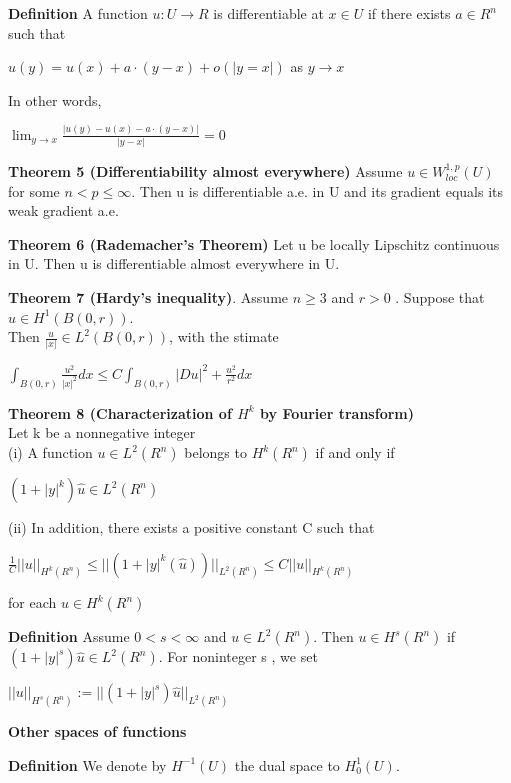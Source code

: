 \documentclass{article}
\newcommand\tab[1][1cm]{\hspace*{#1}}
\begin{document}
\textbf {Definition} A function $u : U \to R$ is differentiable at $x \in U$ if there exists $a \in R^n$ such that
 \begin{center}
$u(y) = u(x) + a \cdot (y-x) + o(|y=x|)$ \tab as $y \to x$
\end{center}
In other words,
 \begin{center}
$\lim_{y \to x} \frac{|u(y) - u(x) - a \cdot (y-x)|}{|y-x|} = 0$
\end{center}

\textbf {Theorem 5 (Differentiability almost everywhere)} Assume $u \in W_{loc}^{1,p}(U)$ for some $n < p \leq \infty$. Then u is differentiable a.e. in U and its gradient equals its weak gradient a.e.

\textbf {Theorem 6 (Rademacher's Theorem)} Let u be locally Lipschitz continuous in U. Then u is differentiable almost everywhere in U.

\textbf {Theorem 7 (Hardy's inequality)}. Assume $n \geq 3$ and $r > 0$ . Suppose that $u \in H^1 (B(0,r))$. \\
\tab Then $\frac{u}{|x|} \in L^2(B(0,r))$, with the stimate
 \begin{center}
$\int_{B(0,r)} \frac{u^2}{|x|^2} dx \leq C \int_{B(0,r)} |Du|^2 + \frac{u^2}{r^2} dx$
\end{center}

\textbf {Theorem 8 (Characterization of $H^k$ by Fourier transform)} \\
Let k be a nonnegative integer \\
\tab (i) A function $u \in L^2(R^n)$ belongs to $H^k (R^n)$ if and only if 
 \begin{center}
$(1 + |y|^k)\hat{u} \in L^2(R^n)$
\end{center}
\tab (ii) In addition, there exists a positive constant C such that
 \begin{center}
$\frac{1}{C}||u||_{H^{k}(R^n)} \leq ||(1 + |y|^k(\hat{u}))||_{L^{2}(R^n)} \leq C||u||_{H^{k}(R^n)}$
\end{center}
for each $u \in H^{k}(R^n)$

\textbf {Definition} Assume $0 < s < \infty$ and $u \in L^2(R^n)$. Then $u \in H^s(R^n)$ if $(1 + |y|^s)\hat{u} \in L^2(R^n)$. For noninteger s , we set 
 \begin{center}
$||u||_{H^{s}(R^n)} := ||(1 + |y|^s)\hat{u}||_{L^{2}(R^n)}$
\end{center} 

\textbf {Other spaces of functions} 

\textbf {Definition} We denote by $H^{-1}(U)$ the dual space to $H_0^1 (U)$.
\end{document}
